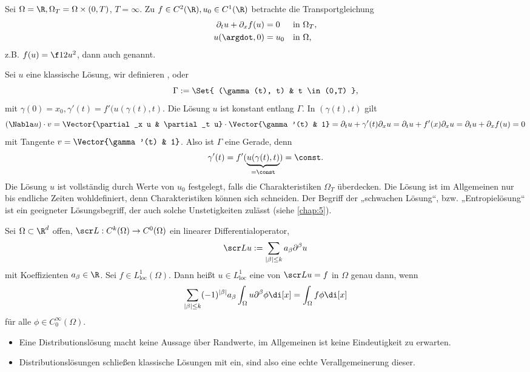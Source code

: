 \begin{ex} \label{1.26}
	Sei $\Omega = \R, \Omega_T = \Omega \times (0,T)$, $T = \infty$.
	Zu $f \in C^2(\R), u_0 \in C^1(\R)$ betrachte die Transportgleichung
	\begin{align*}
		\partial_t u + \partial_x f(u) &= 0 && \text{in $\Omega_T$}, \\
		u(\argdot, 0) &= u_0 && \text{in $\Omega$,}
	\end{align*}
	z.B. $f(u) = \f 12 u^2$, dann auch  genannt.

	Sei $u$ eine klassische Lösung, wir definieren , oder 
	\[
		\Gamma := \Set{ (\gamma(t), t) & t \in (0,T) },
	\]
	mit $\gamma(0) = x_0, \gamma'(t) = f'(u(\gamma(t), t)$.
	Die Lösung $u$ ist konstant entlang $\Gamma$.
	In $(\gamma(t),t)$ gilt
	\[
		(\Nabla u) \cdot v = \Vector{\partial_x u & \partial_t u} \cdot \Vector{\gamma'(t) & 1}
		= \partial_t u + \gamma'(t)  \partial_x u
		= \partial_t u + f'(x) \partial_x u
		= \partial_t u + \partial_x f(u)
		= 0
	\]
	mit Tangente $v = \Vector{\gamma'(t) & 1}$.
	Also ist $\Gamma$ eine Gerade, denn
	\[
		\gamma'(t) = f'(\underbrace{u(\gamma(t), t)}_{=\const}) = \const.
	\]
	Die Lösung $u$ ist vollständig durch Werte von $u_0$ festgelegt, falls die Charakteristiken $\Omega_T$ überdecken.
	Die Lösung ist im Allgemeinen nur bis endliche Zeiten wohldefiniert, denn Charakteristiken können sich schneiden.
	Der Begriff der „schwachen Lösung“, bzw. „Entropielösung“ ist ein geeigneter Lösungsbegriff, der auch solche Unstetigkeiten zulässt (siehe \ref{chap:5}).
\end{ex}

\begin{df}[Distributionslösung] \label{1.27}
	Sei $\Omega \subset \R^d$ offen, $\scr L: C^k(\Omega) \to C^0(\Omega)$ ein linearer Differentialoperator,
	\[
		\scr L u := \sum_{|\beta| \le k} a_\beta \partial^\beta u
	\]
	mit Koeffizienten $a_\beta \in \R$.
	Sei $f \in L^1_{\text{loc}}(\Omega)$.
	Dann heißt $u\in L^1_{\text{loc}}$ eine  von $\scr L u = f$ in $\Omega$ genau dann, wenn
	\begin{equation} \label{eq:1.4}
		\sum_{|\beta|\le k} (-1)^{|\beta|} a_\beta \int_\Omega u \partial^\beta \phi \di[x]
		 = \int_\Omega f \phi \di[x]
	\end{equation}
	für alle $\phi \in C_0^\infty(\Omega)$.
	\begin{note}
		\begin{itemize}
			\item
				Eine Distributionslösung macht keine Aussage über Randwerte, im Allgemeinen ist keine Eindeutigkeit zu erwarten.
			\item
				Distributionslösungen schließen klassische Lösungen mit ein, sind also eine echte Verallgemeinerung dieser.
		\end{itemize}
	\end{note}
\end{df}

